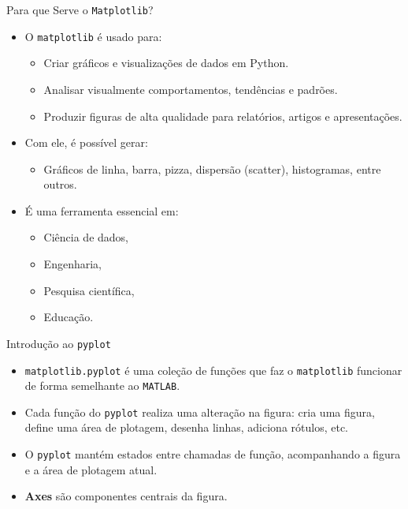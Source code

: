 \begin{frame}{Para que Serve o \texttt{Matplotlib}?}
    \begin{itemize}
        \item O \texttt{matplotlib} é usado para:
              \begin{itemize}
                  \item Criar gráficos e visualizações de dados em Python.
                  \item Analisar visualmente comportamentos, tendências e padrões.
                  \item Produzir figuras de alta qualidade para relatórios, artigos e apresentações.
              \end{itemize}

        \item Com ele, é possível gerar:
              \begin{itemize}
                  \item Gráficos de linha, barra, pizza, dispersão (scatter), histogramas, entre outros.
              \end{itemize}

        \item É uma ferramenta essencial em:
              \begin{itemize}
                  \item Ciência de dados,
                  \item Engenharia,
                  \item Pesquisa científica,
                  \item Educação.
              \end{itemize}
    \end{itemize}
\end{frame}


\begin{frame}{Introdução ao \texttt{pyplot}}
    \begin{itemize}
        \item \texttt{matplotlib.pyplot} é uma coleção de funções que faz o \texttt{matplotlib} funcionar de forma semelhante ao \texttt{MATLAB}.
        \item Cada função do \texttt{pyplot} realiza uma alteração na figura: cria uma figura, define uma área de plotagem, desenha linhas, adiciona rótulos, etc.
        \item O \texttt{pyplot} mantém estados entre chamadas de função, acompanhando a figura e a área de plotagem atual.
        \item \textbf{Axes} são componentes centrais da figura.
    \end{itemize}
\end{frame}




